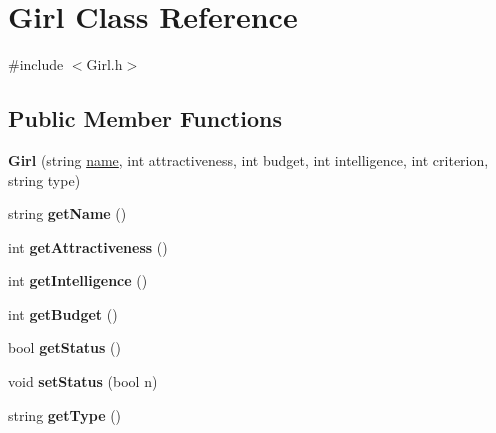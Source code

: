 \hypertarget{class_girl}{}\section{Girl Class Reference}
\label{class_girl}


{\ttfamily \#include $<$Girl.\+h$>$}

\subsection*{Public Member Functions}
\begin{DoxyCompactItemize}
\item 
{\bfseries Girl} (string \hyperlink{class_girl_ace47c55f2f3bc3237f6acba40302b442}{name}, int attractiveness, int budget, int intelligence, int criterion, string type)\hypertarget{class_girl_aeb103f7a37c815574769fef0e2d3895c}{}\label{class_girl_aeb103f7a37c815574769fef0e2d3895c}

\item 
string {\bfseries get\+Name} ()\hypertarget{class_girl_a27a705fb94b92dfd6929d0bf4bcaf5e1}{}\label{class_girl_a27a705fb94b92dfd6929d0bf4bcaf5e1}

\item 
int {\bfseries get\+Attractiveness} ()\hypertarget{class_girl_a04cfe3e0c21240f92c19152630a40252}{}\label{class_girl_a04cfe3e0c21240f92c19152630a40252}

\item 
int {\bfseries get\+Intelligence} ()\hypertarget{class_girl_afe73c4c4f180aa8f5e0bc4f87455ec0b}{}\label{class_girl_afe73c4c4f180aa8f5e0bc4f87455ec0b}

\item 
int {\bfseries get\+Budget} ()\hypertarget{class_girl_af0c663bfcf775c0ab40f56bc49fa2b17}{}\label{class_girl_af0c663bfcf775c0ab40f56bc49fa2b17}

\item 
bool {\bfseries get\+Status} ()\hypertarget{class_girl_ae139ac88e8cee44f0e7bdf908c547cd7}{}\label{class_girl_ae139ac88e8cee44f0e7bdf908c547cd7}

\item 
void {\bfseries set\+Status} (bool n)\hypertarget{class_girl_a1d0d10a3f45be807357c38a5ec2a0321}{}\label{class_girl_a1d0d10a3f45be807357c38a5ec2a0321}

\item 
string {\bfseries get\+Type} ()\hypertarget{class_girl_a2b5bbd35287b7aa074f39702b564bc97}{}\label{class_girl_a2b5bbd35287b7aa074f39702b564bc97}


\end{DoxyCompactItemize}
